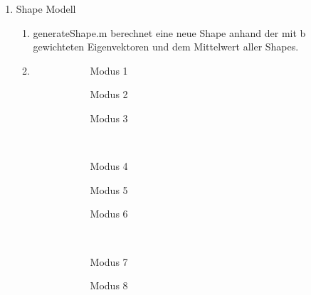 \documentclass[]{report}
\newlength\figureheight
\newlength\figurewidth
\begin{document}
\begin{enumerate}
		\item Shape Modell
		\begin{enumerate}
			\item
			generateShape.m berechnet eine neue Shape anhand der mit b gewichteten Eigenvektoren und dem Mittelwert aller Shapes.
			\item 
			\setlength\figureheight{4cm}
			\setlength{}
			\begin{figure}[tbp!]
				\begin{subfigure}{0.3\textwidth}
					\centering
					
					\caption{Modus 1}
					\label{fig:mode1}
				\end{subfigure}
				\quad
				\begin{subfigure}{0.3\textwidth}
					\centering
					
					\caption{Modus 2}
					\label{fig:mode2}
				\end{subfigure}	
				\quad
				\begin{subfigure}{0.3\textwidth}
					\centering
					
					\caption{Modus 3}
					\label{fig:mode3}
				\end{subfigure}	
				\\
				\begin{subfigure}{0.3\textwidth}
					\centering
					
					\caption{Modus 4}
					\label{fig:mode4}
				\end{subfigure}
				\quad
				\begin{subfigure}{0.3\textwidth}
					\centering
					
					\caption{Modus 5}
					\label{fig:mode5}
				\end{subfigure}	
				\quad
				\begin{subfigure}{0.3\textwidth}
					\centering
					
					\caption{Modus 6}
					\label{fig:mode6}
				\end{subfigure}	
				\\
				\begin{subfigure}{0.3\textwidth}
					\centering
					
					\caption{Modus 7}
					\label{fig:mode7}
				\end{subfigure}
				\quad
				\begin{subfigure}{0.3\textwidth}
					\centering
					
					\caption{Modus 8}
					\label{fig:mode8}
				\end{subfigure}	
				\quad
				\begin{subfigure}{0.3\textwidth}
					\centering
					

\end{subfigure}
\end{figure}
\end{enumerate}
\end{enumerate}
\end{document}
